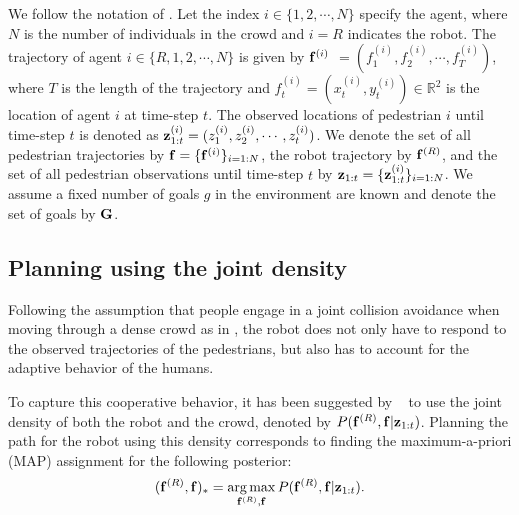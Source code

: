 We follow the notation of \cite{trautman10}.
Let the index $i \in \{1,2,\cdots,N\}$ specify the agent, where $N$ is the number of individuals in the crowd and $i=R$ indicates the robot. 
The trajectory of agent $i \in \{R,1,2,\cdots,N\}$ is given by $\mathbf{f}^{(i)}$ $= (f_1^{(i)}, f_2^{(i)}, \cdots, f_T^{(i)})$, where $T$ is the length of the trajectory and $f_t^{(i)} = (x_t^{(i)}, y_t^{(i)}) \in \mathbb{R}^2$ is the location of agent $i$ at time-step $t$. The observed locations of pedestrian $i$ until time-step $t$ is denoted as $\mathbf{z}^{(i)}_{1:t} = (z_1^{(i)}, z_2^{(i)}, \cdots, z_t^{(i)})$.  We denote the set of all pedestrian trajectories by $\mathbf{f}=\{\mathbf{f}^{(i)}\}_{i=1:N}$, the robot trajectory by $\mathbf{f}^{(R)}$, and the set of all pedestrian observations until time-step $t$ by $\mathbf{z}_{1:t} = \{\mathbf{z}^{(i)}_{1:t}\}_{i=1:N}$. We assume a fixed number of goals $g$ in the environment are known and denote the set of goals by $\mathbf{G}$. %

\subsection{Planning using the joint density}
\label{sec:planning}
%
%
%
%
Following the assumption that people engage in a joint collision
avoidance when moving through a dense crowd
 as in \cite{helbing95,trautman10},
the robot does not only have to respond to the observed trajectories
of the pedestrians, but also has to account for the adaptive behavior
of the humans.

To capture this cooperative behavior, it has been suggested by
~\cite{trautman10} to use the joint density of both the robot and the
crowd, denoted by $P(\mathbf{f}^{(R)}, \mathbf{f}|\mathbf{z}_{1:t})$.
%
%
%
%
%
Planning the path for the robot using this density corresponds to
finding the maximum-a-priori (MAP) assignment for the following
posterior:
\begin{equation}
  \label{eq:8}
  (\mathbf{f}^{(R)}, \mathbf{f})_* = \operatorname*{arg\,max}_{\mathbf{f}^{(R)}, \mathbf{f}} P(\mathbf{f}^{(R)}, \mathbf{f}|\mathbf{z}_{1:t}).
\end{equation}

%
%
%
%
%
%
%

